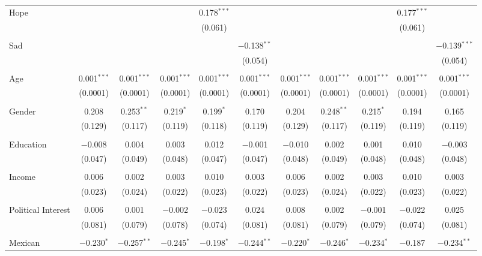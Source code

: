 \begin{table}[!htbp]
\begin{tabular}{@{\extracolsep{5pt}}lcccccccccc}
 Hope &  &  &  & 0.178$^{***}$ &  &  &  &  & 0.177$^{***}$ &  \\ 
  &  &  &  & (0.061) &  &  &  &  & (0.061) &  \\ 
  & & & & & & & & & & \\ 
 Sad &  &  &  &  & $-$0.138$^{**}$ &  &  &  &  & $-$0.139$^{***}$ \\ 
  &  &  &  &  & (0.054) &  &  &  &  & (0.054) \\ 
  & & & & & & & & & & \\ 
 Age & 0.001$^{***}$ & 0.001$^{***}$ & 0.001$^{***}$ & 0.001$^{***}$ & 0.001$^{***}$ & 0.001$^{***}$ & 0.001$^{***}$ & 0.001$^{***}$ & 0.001$^{***}$ & 0.001$^{***}$ \\ 
  & (0.0001) & (0.0001) & (0.0001) & (0.0001) & (0.0001) & (0.0001) & (0.0001) & (0.0001) & (0.0001) & (0.0001) \\ 
  & & & & & & & & & & \\ 
 Gender & 0.208 & 0.253$^{**}$ & 0.219$^{*}$ & 0.199$^{*}$ & 0.170 & 0.204 & 0.248$^{**}$ & 0.215$^{*}$ & 0.194 & 0.165 \\ 
  & (0.129) & (0.117) & (0.119) & (0.118) & (0.119) & (0.129) & (0.117) & (0.119) & (0.119) & (0.119) \\ 
  & & & & & & & & & & \\ 
 Education & $-$0.008 & 0.004 & 0.003 & 0.012 & $-$0.001 & $-$0.010 & 0.002 & 0.001 & 0.010 & $-$0.003 \\ 
  & (0.047) & (0.049) & (0.048) & (0.047) & (0.047) & (0.048) & (0.049) & (0.048) & (0.048) & (0.048) \\ 
  & & & & & & & & & & \\ 
 Income & 0.006 & 0.002 & 0.003 & 0.010 & 0.003 & 0.006 & 0.002 & 0.003 & 0.010 & 0.003 \\ 
  & (0.023) & (0.024) & (0.022) & (0.023) & (0.022) & (0.023) & (0.024) & (0.022) & (0.023) & (0.022) \\ 
  & & & & & & & & & & \\ 
 Political Interest & 0.006 & 0.001 & $-$0.002 & $-$0.023 & 0.024 & 0.008 & 0.002 & $-$0.001 & $-$0.022 & 0.025 \\ 
  & (0.081) & (0.079) & (0.078) & (0.074) & (0.081) & (0.081) & (0.079) & (0.079) & (0.074) & (0.081) \\ 
  & & & & & & & & & & \\ 
 Mexican & $-$0.230$^{*}$ & $-$0.257$^{**}$ & $-$0.245$^{*}$ & $-$0.198$^{*}$ & $-$0.244$^{**}$ & $-$0.220$^{*}$ & $-$0.246$^{*}$ & $-$0.234$^{*}$ & $-$0.187 & $-$0.234$^{**}$ \\ 

\end{tabular}
\end{table}
